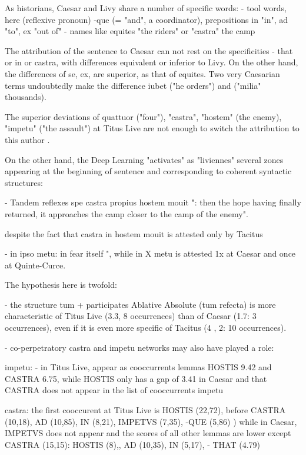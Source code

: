 As historians, Caesar and Livy share a number of specific words:
- tool words, here (reflexive pronoun) -que (= "and", a coordinator), prepositions in "in", ad "to", ex "out of"
- names like equites "the riders" or "castra" the camp

The attribution of the sentence to Caesar can not rest on the specificities - that or in or castra, with differences equivalent or inferior to Livy. On the other hand, the differences of se, ex, are superior, as that of equites. Two very Caesarian terms undoubtedly make the difference iubet ("he orders") and ("milia" thousands).

The superior deviations of quattuor ("four"), "castra", "hostem" (the enemy), "impetu" ("the assault") at Titus Live are not enough to switch the attribution to this author .

On the other hand, the Deep Learning "activates" as "liviennes" several zones appearing at the beginning of sentence and corresponding to coherent syntactic structures:

- Tandem reflexes spe castra propius hostem mouit ": then the hope having finally returned, it approaches the camp closer to the camp of the enemy".

despite the fact that castra in hostem mouit is attested only by Tacitus

- in ipso metu: in fear itself ", while in X metu is attested 1x at Caesar and once at Quinte-Curce.

The hypothesis here is twofold:

- the structure tum + participates Ablative Absolute (tum refecta) is more characteristic of Titus Live (3.3, 8 occurrences) than of Caesar (1.7: 3 occurrences), even if it is even more specific of Tacitus (4 , 2: 10 occurrences).

- co-perpetratory castra and impetu networks may also have played a role:

impetu:
- in Titus Live, appear as cooccurrents lemmas HOSTIS 9.42 and CASTRA 6.75, while HOSTIS only has a gap of 3.41 in Caesar and that CASTRA does not appear in the list of cooccurrents impetu

castra:
the first cooccurent at Titus Live is HOSTIS (22,72), before CASTRA (10,18), AD (10,85), IN (8,21), IMPETVS (7,35), -QUE (5,86) )
while in Caesar, IMPETVS does not appear and the scores of all other lemmas are lower except CASTRA (15,15): HOSTIS (8),, AD (10,35), IN (5,17), - THAT (4.79)

